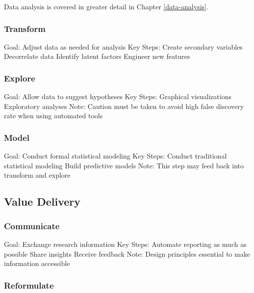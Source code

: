 \documentclass[
]{book}
\begin{document}
Data analysis is covered in greater detail in Chapter \ref{data-analysis}.

\hypertarget{transform}{%
\subsubsection{Transform}\label{transform}}

Goal:
Adjust data as needed for analysis
Key Steps:
Create secondary variables
Decorrelate data
Identify latent factors
Engineer new features

\hypertarget{explore}{%
\subsubsection{Explore}\label{explore}}

Goal:
Allow data to suggest hypotheses
Key Steps:
Graphical visualizations
Exploratory analyses
Note:
Caution must be taken to avoid high false discovery rate when using automated tools

\hypertarget{model}{%
\subsubsection{Model}\label{model}}

Goal:
Conduct formal statistical modeling
Key Steps:
Conduct traditional statistical modeling
Build predictive models
Note:
This step may feed back into transform and explore

\hypertarget{value-delivery2}{%
\subsection{Value Delivery}\label{value-delivery2}}

\hypertarget{communicate}{%
\subsubsection{Communicate}\label{communicate}}

Goal:
Exchange research information
Key Steps:
Automate reporting as much as possible
Share insights
Receive feedback
Note:
Design principles essential to make information accessible

\hypertarget{reformulate}{%
\subsubsection{Reformulate}\label{reformulate}}
\end{document}
